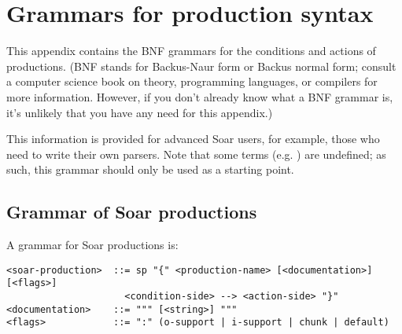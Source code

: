 \chapter{Grammars for production syntax}
\label{GRAMMARS}

This appendix contains the BNF grammars for the conditions and actions of
productions. (BNF stands for Backus-Naur form or Backus normal form; consult a
computer science book on theory, programming languages, or compilers for more
information. However, if you don't already know what a BNF grammar is, it's
unlikely that you have any need for this appendix.)

This information is provided for advanced Soar users, for example, those who
need to write their own parsers. Note that some terms (e.g. )
are undefined; as such, this grammar should only be used as a starting point.




\section{Grammar of Soar productions}

A grammar for Soar productions is:
\begin{verbatim}
<soar-production>  ::= sp "{" <production-name> [<documentation>] [<flags>]
                     <condition-side> --> <action-side> "}"
<documentation>    ::= """ [<string>] """
<flags>            ::= ":" (o-support | i-support | chunk | default)
\end{verbatim}

